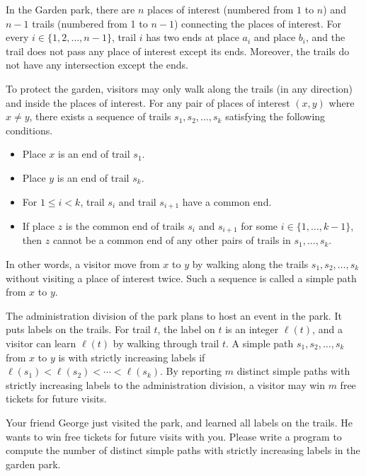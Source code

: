 In the Garden park, there are $n$ places of interest (numbered from $1$ to $n$)
and $n-1$ trails (numbered from 1 to $n-1$) connecting the places of interest. 
For every $i\in\{1,2,\dots,n-1\}$, trail $i$ has two ends at place $a_i$ and 
place $b_i$, and the trail does not pass any place of interest except its ends. 
Moreover, the trails do not have any intersection except the ends.

To protect the garden, visitors may only walk along the trails 
(in any direction)
and inside the places of interest. For any pair of places
of interest $(x, y)$ where $x\neq y$, 
there exists a sequence of trails $s_1,s_2,\dots,s_k$
satisfying the following conditions.
\begin{itemize}
\item Place $x$ is an end of trail $s_1$.
\item Place $y$ is an end of trail $s_k$.
\item For $1\le i < k$, trail $s_i$ and trail $s_{i+1}$ have a common end.
\item If place $z$ is the common end of trails $s_i$ and $s_{i+1}$ for some
$i\in\{1,\dots,k-1\}$, then $z$ cannot be a common end of any other pairs of 
trails in $s_1,\dots,s_k$.
\end{itemize}
In other words, a visitor move from $x$ to $y$ by walking along the trails
$s_1,s_2,\dots,s_k$ without visiting a place of interest twice. 
Such a sequence is called a simple path from $x$ to $y$.

The administration division of the park plans to host an event in the park.
It puts labels on the trails. For trail $t$, the label on $t$ is an
integer $\ell(t)$, and a visitor can learn $\ell(t)$ by walking through 
trail $t$.
A simple path $s_1,s_2,\dots,s_k$ from $x$ to $y$ is 
with strictly increasing labels if $\ell(s_1)<\ell(s_2)<\cdots<\ell(s_k)$.
By reporting $m$ distinct simple paths with 
strictly increasing labels to the administration division, 
a visitor may win $m$ free tickets for future visits.

Your friend George just visited the park, and learned all labels on the trails.
He wants to win free tickets for future visits with you.
Please write a program to compute the number of distinct simple paths 
with strictly increasing labels in
the garden park.
